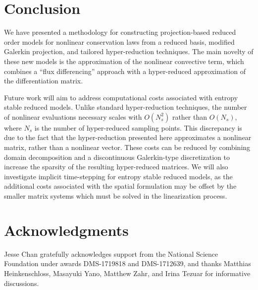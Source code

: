 \documentclass[preprint,10pt]{elsarticle}
\theoremstyle{definition}
\theoremstyle{lemma}
\theoremstyle{theorem}
\theoremstyle{assumption}
\newcommand{\note}[1]{{\color{blue}{#1}}}
\begin{document}
\note{We conclude by examining a 2D problem with a non-trivial shock structure.  }



\section{Conclusion}  We have presented a methodology for constructing projection-based reduced order models for nonlinear conservation laws from a reduced basis, modified Galerkin projection, and tailored hyper-reduction techniques.  The main novelty of these new models is the approximation of the nonlinear convective term, which combines a ``flux differencing'' approach with a hyper-reduced approximation of the differentiation matrix.  

Future work will aim to address computational costs associated with entropy stable reduced models.  Unlike standard hyper-reduction techniques, the number of nonlinear evaluations necessary scales with $O(N_s^2)$ rather than $O(N_s)$, where $N_s$ is the number of hyper-reduced sampling points.  This discrepancy is due to the fact that the hyper-reduction presented here approximates a nonlinear matrix, rather than a nonlinear vector.  These costs can be reduced by combining domain decomposition \cite{lucia2003reduced} and a discontinuous Galerkin-type discretization \cite{chan2017discretely} to increase the sparsity of the resulting hyper-reduced matrices.  We will also investigate implicit time-stepping for entropy stable reduced models, as the additional costs associated with the spatial formulation may be offset by the smaller matrix systems which must be solved in the linearization process.

\section{Acknowledgments}

Jesse Chan gratefully acknowledges support from the National Science Foundation under awards DMS-1719818 and DMS-1712639, and thanks Matthias Heinkenschloss, Masayuki Yano, Matthew Zahr, and Irina Tezuar for informative discussions.



\end{document}
